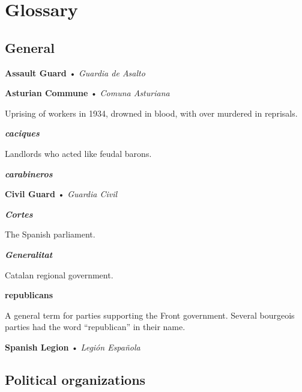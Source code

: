 \chapter{Glossary}

\section{General}

\begin{multicols}{2}
  \small
  \RaggedRight
  \setlength{\parskip}{0.25\baselineskip}

\textbf{Assault Guard} • \emph{Guardia de Asalto}

\bigskip

\textbf{Asturian Commune} • \emph{Comuna Asturiana}

Uprising of workers in 1934, drowned in blood, with over  murdered in reprisals.

\bigskip

\textbf{\emph{caciques}}

Landlords who acted like feudal barons.

\bigskip

\textbf{\emph{carabineros}}

\bigskip

\textbf{Civil Guard} • \emph{Guardia Civil}

\bigskip

\textbf{\emph{Cortes}}

The Spanish parliament.

\bigskip

\textbf{\emph{Generalitat}}

Catalan regional government.

\bigskip

\textbf{republicans}

A general term for parties supporting the Front government. Several bourgeois parties had the word “republican” in their name.

\bigskip

\textbf{Spanish Legion} • \emph{Legión Española}

\end{multicols}

\section{Political organizations}

